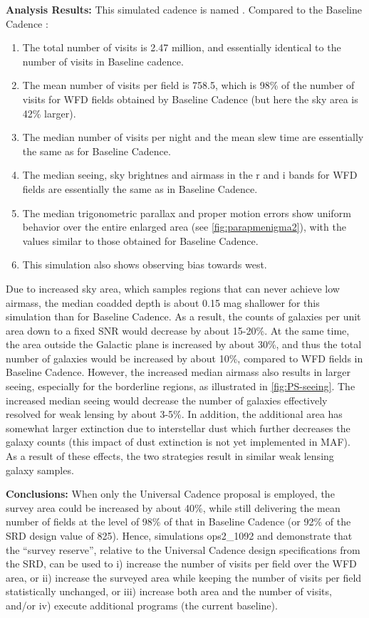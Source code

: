 {\bf Analysis Results:}  This simulated cadence is named .
Compared to the Baseline Cadence :
\begin{enumerate}
\item The total number of visits is 2.47 million, and essentially identical to the
number of visits in Baseline cadence.
\item
The mean number of visits per field is 758.5, which is 98\% of the number of visits
for WFD fields obtained by Baseline Cadence (but here the sky area is 42\% larger).
\item The median number of visits per night and the mean slew time are
essentially the same as for Baseline Cadence.
\item The median seeing, sky brightnes and airmass in the r and i bands for WFD fields are
         essentially the same as in Baseline Cadence.
\item The median trigonometric parallax and proper motion errors show
uniform behavior over the entire enlarged area (see \autoref{fig:parapmenigma2}),
with the values similar to those obtained for Baseline Cadence.
\item This simulation also shows observing bias towards west.
\end{enumerate}

Due to increased sky area, which samples regions that can never
achieve low airmass, the median coadded depth is about 0.15 mag
shallower for this simulation than for Baseline Cadence. As a result,
the counts of galaxies per unit area down to a fixed SNR would
decrease by about 15-20\%. At the same time, the area outside the
Galactic plane is increased by about 30\%, and thus the total number
of galaxies would be increased by about 10\%, compared to WFD fields
in Baseline Cadence. However, the increased median airmass also
results in larger seeing, especially for the borderline regions, as
illustrated in \autoref{fig:PS-seeing}. The increased median seeing
would decrease the number of galaxies effectively resolved for weak
lensing by about 3-5\%. In addition, the additional area has somewhat
larger extinction due to interstellar dust which further decreases the
galaxy counts (this impact of dust extinction is not yet implemented
in MAF). As a result of these effects, the two strategies result in
similar weak lensing galaxy samples.

{\bf Conclusions:} When only the Universal Cadence proposal is
employed, the survey area could be increased by about 40\%, while
still delivering the mean number of fields at the level of 98\% of
that in Baseline Cadence (or 92\% of the SRD design value of 825).
Hence, simulations ops2\_1092  and  demonstrate
that the ``survey reserve'', relative to the Universal Cadence design
specifications from the SRD, can be used to i) increase the number of
visits per field over the WFD area,  or ii) increase the surveyed area
while keeping the number of visits per field statistically unchanged,
or iii) increase both area and the number of visits, and/or iv)
execute additional programs (the current baseline).


